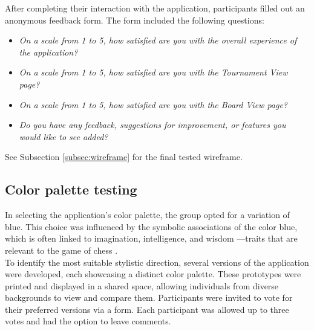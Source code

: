 After completing their interaction with the application, participants filled out an anonymous feedback form. The form included the following questions:

\begin{itemize}
    \item \textit{On a scale from 1 to 5, how satisfied are you with the overall experience of the application?}
    \item \textit{On a scale from 1 to 5, how satisfied are you with the Tournament View page?}
    \item \textit{On a scale from 1 to 5, how satisfied are you with the Board View page?}
    \item \textit{Do you have any feedback, suggestions for improvement, or features you would like to see added?}
\end{itemize}

See Subsection \ref{subsec:wireframe} for the final tested wireframe.

\subsection{Color palette testing}
\label{subsubsec:color-palette}

In selecting the application’s color palette, the group opted for a variation of blue. This choice was influenced by the symbolic associations of the color blue, which is often linked to imagination, intelligence, and wisdom \cite{blue}—traits that are relevant to the game of chess \cite{chess:ppqty, chess:chess-and-creativity}. \\

To identify the most suitable stylistic direction, several versions of the application were developed, each showcasing a distinct color palette. These prototypes were printed and displayed in a shared space, allowing individuals from diverse backgrounds to view and compare them. Participants were invited to vote for their preferred versions via a form. Each participant was allowed up to three votes and had the option to leave comments.




